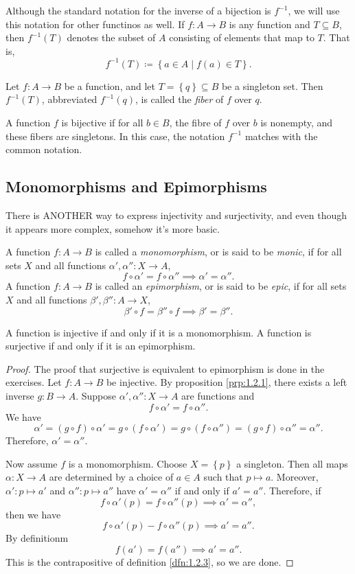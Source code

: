 Although the standard notation for the inverse of a bijection is $f^{-1}$, we will use this notation for other functinos as well. If  $f: A \to B$ is any function and $T\subseteq B$, then $f^{-1}(T)$ denotes the subset of $A$ consisting of elements that map to $T$. That is,
\[
	f^{-1}(T)\coloneqq \left\{ a\in A  \mid f(a)\in T \right\} 
.\]
\begin{definition}[Fiber]\label{dfn:1.2.5}
	Let $f : A \to B$ be a function, and let $T=\left\{ q \right\} \subseteq B$ be a singleton set. Then $f^{-1}(T)$, abbreviated $f^{-1}(q)$, is called the \emph{fiber} of $f$ over $q$.
\end{definition}
A function $f$ is bijective if for all $b\in B$, the fibre of $f$ over $b$ is nonempty, and these fibers are singletons. In this case, the notation $f^{-1}$ matches with the common notation.
\subsection{Monomorphisms and Epimorphisms}
There is ANOTHER way to express injectivity and surjectivity, and even though it appears more complex, somehow it's more basic.
\begin{definition}\label{dfn:1.2.6}
	A function $f : A \to B$ is called a \emph{monomorphism}, or is said to be \emph{monic}, if for all sets $X$ and all functions $\alpha',\alpha '': X \to A$,
	\[
		f\circ \alpha '=f\circ \alpha ''\implies \alpha '=\alpha ''
	.\]
	A function $f : A \to B$ is called an \emph{epimorphism}, or is said to be \emph{epic}, if for all sets $X$ and all functions $\beta ',\beta '': A \to X$,
	\[
		\beta '\circ f=\beta ''\circ f\implies \beta '=\beta ''
	.\]
\end{definition}
\begin{proposition}\label{prp:1.2.2}
	A function is injective if and only if it is a monomorphism. A function is surjective if and only if it is an epimorphism.
\end{proposition}
\begin{proof}
	The proof that surjective is equivalent to epimorphism is done in the exercises. Let $f : A \to B$ be injective. By proposition \ref{prp:1.2.1}, there exists a left inverse $g : B \to A$. Suppose $\alpha ',\alpha '': X \to A$ are functions and
	\[
		f\circ \alpha '=f\circ \alpha ''
	.\]
	We have
	\[
		\alpha '=(g\circ f)\circ \alpha '=g\circ (f\circ \alpha ')=g\circ (f\circ \alpha '')=(g\circ f)\circ \alpha ''=\alpha ''
	.\]
	Therefore, $\alpha '=\alpha ''$.

	Now assume $f$ is a monomorphism. Choose $X=\left\{ p \right\} $ a singleton. Then all maps $\alpha : X \to A$ are determined by a choice of $a\in A$ such that $p\mapsto a$. Moreover, $\alpha': p \mapsto  a'$ and $\alpha '': p \mapsto  a''$ have $\alpha '=\alpha ''$ if and only if $a'=a''$. Therefore, if
	\[
		f\circ \alpha '(p)=f\circ \alpha ''(p)\implies \alpha '=\alpha ''
	,\]
	then we have
	\[
		f\circ \alpha'(p)-f\circ \alpha ''(p)\implies a'=a''
	.\]
	By definitionm
	\[
		f(a')=f(a'')\implies a'=a''
	.\]
	This is the contrapositive of definition \ref{dfn:1.2.3}, so we are done.
\end{proof}

